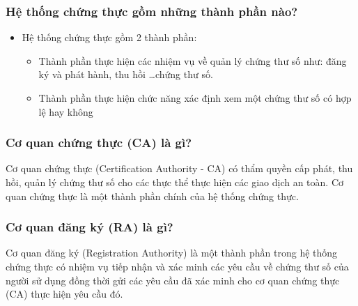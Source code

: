 \documentclass[a4paper,12pt]{report}
\begin{document}
\subsubsection{Hệ thống chứng thực gồm những thành phần nào?}
\begin{itemize}
\item Hệ thống chứng thực gồm 2 thành phần:
\begin{itemize}
\item Thành phần thực hiện các nhiệm vụ về quản lý chứng thư số như: đăng ký và phát hành, thu hồi \ldots chứng thư số.
\item Thành phần thực hiện chức năng xác định xem một chứng thư số có hợp lệ hay không
\end{itemize}
\end{itemize}
\subsubsection{Cơ quan chứng thực (CA) là gì?}
Cơ quan chứng thực (Certification Authority - CA) có thẩm quyền cấp phát, thu hồi, quản lý chứng thư số cho các thực thể thực hiện các giao dịch an toàn. Cơ quan chứng thực là một thành phần chính của hệ thống chứng thực.
\subsubsection{Cơ quan đăng ký (RA) là gì?}
Cơ quan đăng ký (Registration Authority) là một thành phần trong hệ thống chứng thực có nhiệm vụ tiếp nhận và xác minh các yêu cầu về chứng thư số của người sử dụng đồng thời gửi các yêu cầu đã xác minh cho cơ quan chứng thực (CA) thực hiện yêu cầu đó.
\end{document}
